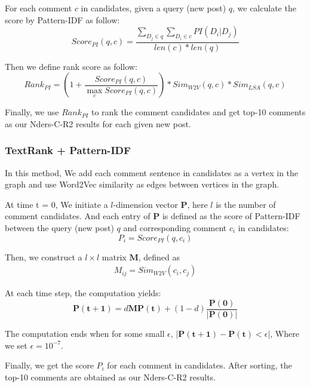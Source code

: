 \documentclass{sig-alternate}
\begin{document}
For each comment $c$ in candidates, given a query (new post) $q$, we calculate the score by Pattern-IDF as follow:
\begin{equation}
  Score_{PI}(q, c) = \frac{\sum_{D_j \in q}{\sum_{D_i \in c}{PI(D_i|D_j)}}}{len(c) * len(q)}
\end{equation}

Then we define rank score as follow:
\begin{equation}
  Rank_{PI} = (1 + \frac{Score_{PI}(q, c)}{\max_c{Score_{PI}(q, c)}}) * Sim_{W2V}(q, c)*Sim_{LSA}(q, c)  
\end{equation}

Finally, we use $Rank_{PI}$ to rank the comment candidates and get top-10 comments as our Nders-C-R2 results for each given new post.

\subsubsection{TextRank + Pattern-IDF}
In this method, We add each comment sentence in candidates as a vertex in the 
graph and use Word2Vec similarity as edges between vertices in the graph. 

At time t = 0, We initiate a $l$-dimension vector $\bm{P}$, here $l$ is the 
number of comment candidates. And each entry of $\bm{P}$ is defined as the 
score of Pattern-IDF between the query (new post) $q$ and corresponding comment
$c_i$ in candidates:
\begin{equation}
  P_i = Score_{PI}(q, c_i)
\end{equation} 

Then, we construct a $l \times l$ matrix $\bm{M}$, defined as
\begin{equation}
  \begin{aligned}
    M_{ij} = Sim_{W2V}(c_i, c_j)
  \end{aligned}
\end{equation}

At each time step, the computation yields:
\begin{equation}
  \bm{P(t+1)} = d\bm{M}\bm{P(t)} + (1-d)\frac{\bm{P(0)}}{|\bm{P(0)}|}
\end{equation}

The computation ends when for some small $\epsilon$, $|\bm{P(t+1)} - \bm{P(t)} < \epsilon|$, Where we set $\epsilon = 10^{-7}$.

Finally, we get the score $P_i$ for each comment in candidates. After sorting, 
the top-10 comments are obtained as our Nders-C-R2 results.
\end{document}
